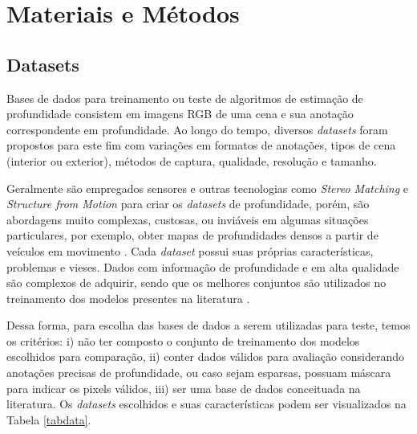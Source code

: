 
\chapter{Materiais e Métodos}

\section{Datasets}

Bases de dados para treinamento ou teste de algoritmos de estimação de profundidade consistem em imagens RGB de uma cena e sua anotação correspondente em profundidade. Ao longo do tempo, diversos \textit{datasets} foram propostos para este fim com variações em formatos de anotações, tipos de cena (interior ou exterior), métodos de captura, qualidade, resolução e tamanho.


Geralmente são empregados sensores e outras tecnologias como \textit{Stereo Matching} e \textit{Structure from Motion} para criar os \textit{datasets} de profundidade, porém, são abordagens muito complexas, custosas, ou inviáveis em algumas situações particulares, por exemplo, obter mapas de profundidades densos a partir de veículos em movimento  \cite{yang2024depthv1}.
Cada \textit{dataset} possui suas próprias características, problemas e vieses. Dados com informação de profundidade e em alta qualidade são complexos de adquirir, sendo que os melhores conjuntos são utilizados no treinamento dos modelos presentes na literatura \cite{ranftl2020towards}. 



Dessa forma, para escolha das bases de dados a serem utilizadas para teste, temos os critérios: i) não ter composto o conjunto de treinamento dos modelos escolhidos para comparação, ii) conter dados válidos para avaliação considerando anotações precisas de profundidade, ou caso sejam esparsas, possuam máscara para indicar os pixels válidos, iii) ser uma base de dados conceituada na literatura. Os \textit{datasets} escolhidos e suas características podem ser visualizados na Tabela \ref{tabdata}.


